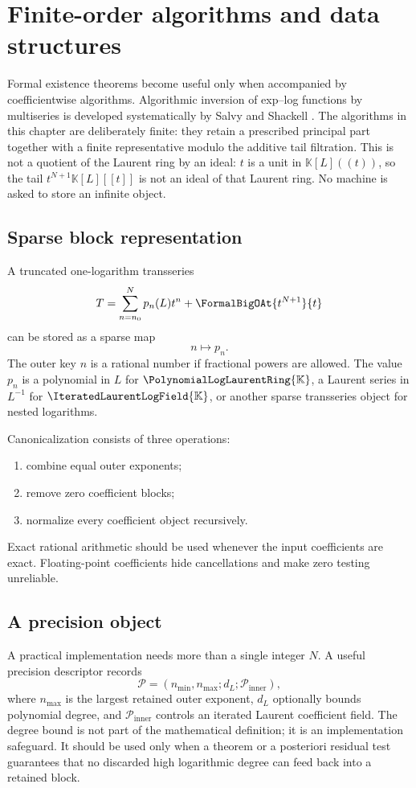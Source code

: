 \documentclass[11pt,oneside]{book}
\theoremstyle{definition}
\theoremstyle{remark}
\newcommand{\K}{\mathbb K}
\newcommand{\PLpoly}{\PolynomialLogLaurentRing{\K}}
\newcommand{\PLfield}{\IteratedLaurentLogField{\K}}
\begin{document}
\chapter{Finite-order algorithms and data structures}
\label{ch:implementation}

Formal existence theorems become useful only when accompanied by
coefficientwise algorithms. Algorithmic inversion of exp--log functions by
multiseries is developed systematically by Salvy and Shackell
\cite{SalvyShackell1999}. The algorithms in this chapter are deliberately
finite: they retain a prescribed principal part together with a finite
representative modulo the additive tail filtration.  This is not a quotient
of the Laurent ring by an ideal: \(t\) is a unit in \(\K[L]((t))\), so the
tail \(t^{N+1}\K[L][[t]]\) is not an ideal of that Laurent ring.  No machine is
asked to store an infinite object.

\section{Sparse block representation}
A truncated one-logarithm transseries
\[
 T=\sum_{n=n_0}^{N}p_n(L)t^n+\FormalBigOAt{t^{N+1}}{t}
\]
can be stored as a sparse map
\[
 n\longmapsto p_n.
\]
The outer key $n$ is a rational number if fractional powers are allowed.
The value $p_n$ is a polynomial in $L$ for $\PLpoly$, a Laurent series in
$L^{-1}$ for $\PLfield$, or another sparse transseries object for nested
logarithms.

Canonicalization consists of three operations:
\begin{enumerate}
\item combine equal outer exponents;
\item remove zero coefficient blocks;
\item normalize every coefficient object recursively.
\end{enumerate}
Exact rational arithmetic should be used whenever the input coefficients are
exact. Floating-point coefficients hide cancellations and make zero testing
unreliable.

\section{A precision object}
A practical implementation needs more than a single integer $N$. A useful
precision descriptor records
\[
 \mathcal P=(n_{\min},n_{\max};d_L;\mathcal P_{\mathrm{inner}}),
\]
where $n_{\max}$ is the largest retained outer exponent, $d_L$ optionally
bounds polynomial degree, and $\mathcal P_{\mathrm{inner}}$ controls an
iterated Laurent coefficient field. The degree bound is not part of the
mathematical definition; it is an implementation safeguard. It should be
used only when a theorem or a posteriori residual test guarantees that no
discarded high logarithmic degree can feed back into a retained block.
\end{document}
